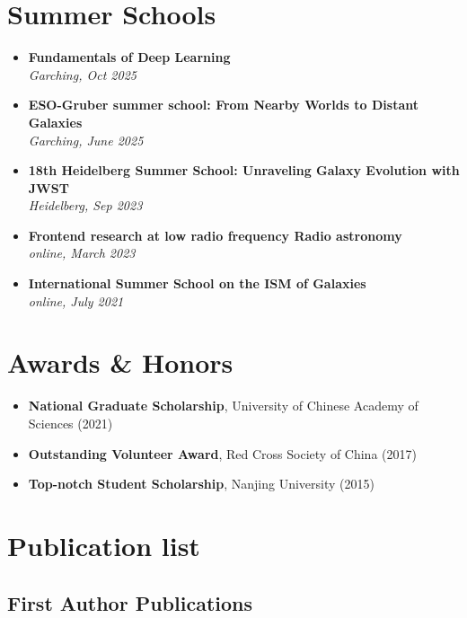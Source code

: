 \documentclass[12pt,a4paper]{article}
\begin{document}
\section*{Summer Schools}
\begin{itemize}[leftmargin=*, itemsep=4pt, parsep=0pt]
  \item \textbf{Fundamentals of Deep Learning} \\ \hfill \textit{Garching, Oct 2025}
  \item \textbf{ESO-Gruber summer school: From Nearby Worlds to Distant Galaxies} \\ \hfill \textit{Garching, June 2025}
  \item \textbf{18th Heidelberg Summer School: Unraveling Galaxy Evolution with JWST} \\ \hfill \textit{Heidelberg, Sep 2023}
  \item \textbf{Frontend research at low radio frequency Radio astronomy} \\ \hfill \textit{online, March 2023}
  \item \textbf{International Summer School on the ISM of Galaxies} \\ \hfill \textit{online, July 2021}
\end{itemize}

\section*{Awards \& Honors}

\begin{itemize}[leftmargin=*, itemsep=2pt]
  \item {\bf National Graduate Scholarship}, University of Chinese Academy of Sciences (2021)
  \item {\bf Outstanding Volunteer Award}, Red Cross Society of China (2017)
  \item {\bf Top-notch Student Scholarship}, Nanjing University (2015)
\end{itemize}


\newpage


\section*{Publication list}

\subsection*{First Author Publications}
\end{document}
